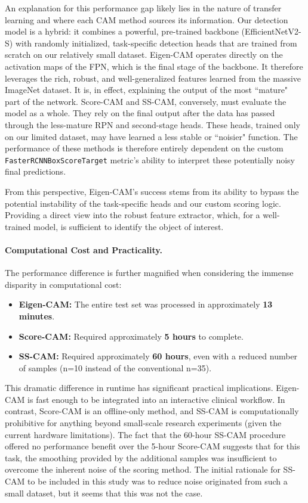 An explanation for this performance gap likely lies in the nature of transfer learning and where each CAM method sources its information. Our detection model is a hybrid: it combines a powerful, pre-trained backbone (EfficientNetV2-S) with randomly initialized, task-specific detection heads that are trained from scratch on our relatively small dataset.
Eigen-CAM operates directly on the activation maps of the FPN, which is the final stage of the backbone. It therefore leverages the rich, robust, and well-generalized features learned from the massive ImageNet dataset. It is, in effect, explaining the output of the most ``mature" part of the network.
Score-CAM and SS-CAM, conversely, must evaluate the model as a whole. They rely on the final output after the data has passed through the less-mature RPN and second-stage heads. These heads, trained only on our limited dataset, may have learned a less stable or ``noisier" function. The performance of these methods is therefore entirely dependent on the custom \texttt{FasterRCNNBoxScoreTarget} metric's ability to interpret these potentially noisy final predictions.
 
From this perspective, Eigen-CAM's success stems from its ability to bypass the potential instability of the task-specific heads and our custom scoring logic. Providing a direct view into the robust feature extractor, which, for a well-trained model, is sufficient to identify the object of interest.

\paragraph{Computational Cost and Practicality.}
The performance difference is further magnified when considering the immense disparity in computational cost:
\begin{itemize}
    \item \textbf{Eigen-CAM:} The entire test set was processed in approximately \textbf{13 minutes}.
    \item \textbf{Score-CAM:} Required approximately \textbf{5 hours} to complete.
    \item \textbf{SS-CAM:} Required approximately \textbf{60 hours}, even with a reduced number of samples (n=10 instead of the conventional n=35).
\end{itemize}

This dramatic difference in runtime has significant practical implications. Eigen-CAM is fast enough to be integrated into an interactive clinical workflow. In contrast, Score-CAM is an offline-only method, and SS-CAM is computationally prohibitive for anything beyond small-scale research experiments (given the current hardware limitations). The fact that the 60-hour SS-CAM procedure offered no performance benefit over the 5-hour Score-CAM suggests that for this task, the smoothing provided by the additional samples was insufficient to overcome the inherent noise of the scoring method. The initial rationale for SS-CAM to be included in this study was to reduce noise originated from such a small dataset, but it seems that this was not the case.


